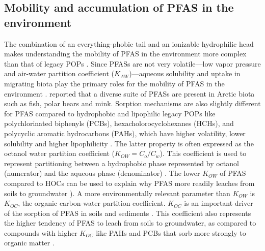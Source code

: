 \subsection{Mobility and accumulation of PFAS in the environment}
The combination of an everything-phobic tail and an ionizable hydrophilic head makes understanding the mobility of PFAS in the environment more complex than that of legacy POPs \citep{cabrerizo2018legacy,Arp2006}. Since PFASs are not very volatile---low vapor pressure and air-water partition coefficient ($K_{AW}$)---aqueous solubility and uptake in migrating biota play the primary roles for the mobility of PFAS in the environment \citep{Arp2006}. \cite{Schlabach2017} reported that a diverse suite of PFASs are present in Arctic biota such as fish, polar bears and mink. Sorption mechanisms are also slightly different for PFAS compared to hydrophobic and lipophilic legacy POPs like polychlorinated biphenyls (PCBs), hexacholorocyclohexanes (HCHs), and polycyclic aromatic hydrocarbons (PAHs), which have higher volatility, lower solubility and higher lipophilicity \citep{cabrerizo2018legacy,Cornelissen2005,li2018}. The latter property is often expressed as the octanol water partition coefficient (\(K_{OW} = C_{o}/C_w\)). This coefficient is used to represent partitioning between a hydrophobic phase represented by octanol (numerator) and the aqueous phase (denominator) \citep{Reemtsma2016}. The lower \(K_{OW}\) of PFAS compared to HOCs can be used to explain why PFAS more readily leaches from soils to groundwater \citep{Cornelissen2005,du2014adsorption}). A more environmentally relevant parameter than \(K_{OW}\) is \(K_{OC}\), the organic carbon-water partition coefficient. \(K_{OC}\) is an important driver of the sorption of PFAS in soils and sediments \citep{zareitalabad2013perfluorooctanoic}. This coefficient also represents the higher tendency of PFAS to leach from soils to groundwater, as compared to compounds with higher $K_{OC}$ like PAHs and PCBs that sorb more strongly to organic matter \citep{Cornelissen2005}. 


